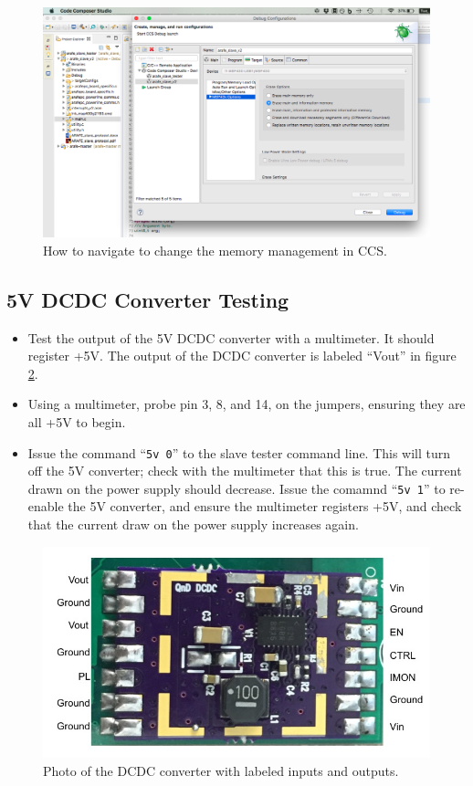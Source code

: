 \documentclass[letter,12pt]{article}
\begin{document}
\begin{figure}
\begin{centering}
\includegraphics[width=.75\textwidth]{photos/ccs-setup-2.png}
\par\end{centering}
\caption{How to navigate to change the memory management in CCS.}
\label{CCS-change-2}
\end{figure}

\subsection{5V DCDC Converter Testing}
\begin{itemize}
\item Test the output of the 5V DCDC converter with a multimeter. It should register +5V. The output of the DCDC converter is labeled ``Vout'' in figure \ref{DCDC}.
\item Using a multimeter, probe pin 3, 8, and 14, on the jumpers, ensuring they are all +5V to begin.
\item Issue the command ``\texttt{5v 0}'' to the slave tester command line. This will turn off the 5V converter; check with the multimeter that this is true. The current drawn on the power supply should decrease. Issue the comamnd ``\texttt{5v 1}'' to re-enable the 5V converter, and ensure the multimeter registers +5V, and check that the current draw on the power supply increases again.
\end{itemize}

\begin{figure}
\begin{centering}
\includegraphics[width=\textwidth]{photos/DCDC.jpg}
\par\end{centering}
\caption{Photo of the DCDC converter with labeled inputs and outputs.}
\label{DCDC}
\end{figure}
\end{document}
